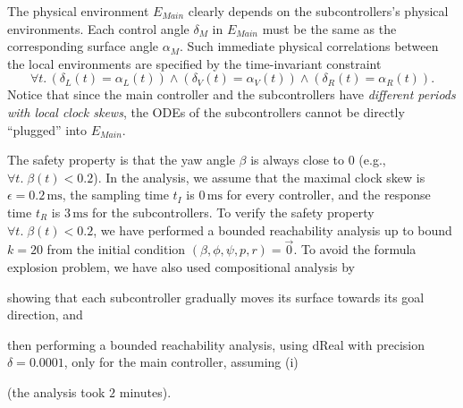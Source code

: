 The physical environment $E_\mathit{Main}$ clearly depends on the subcontrollers's physical environments.
Each control angle $\delta_M$ in  $E_\mathit{Main}$ must be the same as the corresponding surface angle $\alpha_M$.
%
Such  immediate physical correlations between the local %
environments are specified by the time-invariant constraint
%
\[\forall t.\, (\delta_L(t) = \alpha_L(t)) \wedge (\delta_V(t) = \alpha_V(t)) \wedge (\delta_R(t) = \alpha_R(t)).
\]
Notice that since the main controller and the subcontrollers have \emph{different periods with local clock skews},
the ODEs of the subcontrollers cannot be directly ``plugged'' into $E_\mathit{Main}$.

The safety property %
is that the yaw angle $\beta$ is always close to $0$ (e.g., $\forall t.\; \beta(t) < 0.2$).
%
In the analysis,
we assume that the maximal clock skew is $\epsilon = 0.2\,\mathrm{ms}$,
the sampling time $t_I$ is $0\,\mathrm{ms}$ for every controller,
and the response time $t_R$ is $3\,\mathrm{ms}$ for the subcontrollers.
%
To verify the safety property $\forall t.\; \beta(t) < 0.2$,
we have performed a bounded reachability analysis 
up to bound $k = 20$ from the initial condition 
$(\beta, \phi, \psi, p, r) = \vec{0}$. %
%
To avoid the formula explosion problem, 
we have also used compositional analysis by 
\begin{inparaenum}[(i)]
	\item showing that each subcontroller gradually moves its surface towards its goal direction, and 
	\item then performing a bounded reachability analysis,
	using \textsf{dReal} with precision $\delta = 0.0001$,
	 only for the main controller,  assuming (i)
\end{inparaenum}
(the analysis took $2$ minutes).





